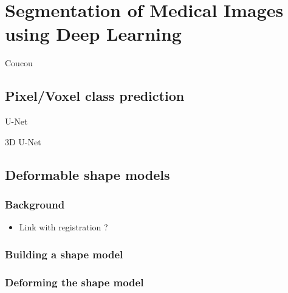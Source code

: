 \chapter{Segmentation of Medical Images using Deep Learning}
\label{chap:seg}

\begin{chapabstract}
 Coucou
\end{chapabstract}

\vspace{1cm}

{   
    \minitoc
}

\newpage

\section{Pixel/Voxel class prediction}

U-Net~\textcite{ronneberger2015MICCAI}

3D U-Net~\textcite{cicek2016MICCAI}

\section{Deformable shape models}

\subsection{Background}

\begin{itemize}
    \item Link with registration ?
\end{itemize}

\subsection{Building a shape model}

\subsection{Deforming the shape model}

